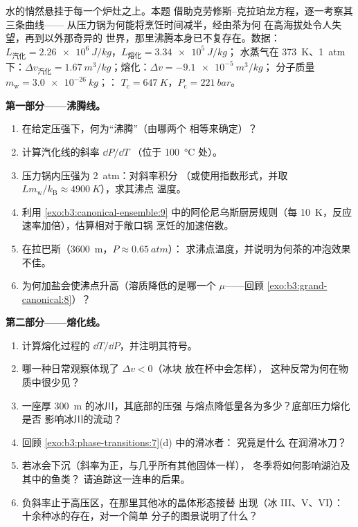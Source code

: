 \begin{problem}\label{pb:b3:phase-transitions:1}
水的悄然悬挂于每一个炉灶之上。本题
借助克劳修斯–克拉珀龙方程，逐一考察其三条曲线——
从压力锅为何能将烹饪时间减半，经由茶为何
在高海拔处令人失望，再到以外那奇异的
世界，那里沸腾本身已不复存在。数据：$L_{\text{汽化}}
= \qty{2.26e6}{J/kg}$，$L_{\text{熔化}} = \qty{3.34e5}{J/kg}$；
水蒸气在 \qty{373}{K}、\qty{1}{atm} 下：$\Delta v_{\text{汽化}}
= \qty{1.67}{m^3/kg}$；熔化：$\Delta v = \qty{-9.1e-5}{m^3/kg}$；
分子质量 $m_{\text{w}} = \qty{3.0e-26}{kg}$；：
$T_{\text{c}} = \qty{647}{K}$，$P_{\text{c}} = \qty{221}{bar}$。

\medskip\noindent\textbf{第一部分——沸腾线。}
\begin{enumerate}
  \item 在给定压强下，何为“沸腾”（由哪两个
        相等来确定）？
  \item 计算汽化线的斜率 $\dd P/\dd T$
        （位于 \qty{100}{\celsius} 处）。
  \item 压力锅内压强为 \qty{2}{atm}：对斜率积分
        （或使用指数形式，并取 $Lm_{\text{w}}/
        k_{\text{B}} \approx \qty{4900}{K}$），求其沸点
        温度。
  \item 利用
        \cref{exo:b3:canonical-ensemble:9} 中的阿伦尼乌斯厨房规则（每
        \qty{10}{K}，反应速率加倍），估算相对于敞口锅
        烹饪的加速倍数。
  \item 在拉巴斯（\qty{3600}{m}，$P \approx \qty{0.65}{atm}$）：
        求沸点温度，并说明为何茶的冲泡效果不佳。
  \item 为何加盐会使沸点升高（溶质降低的是哪一个
         $\mu$——回顾
        \cref{exo:b3:grand-canonical:8}）？
\end{enumerate}

\medskip\noindent\textbf{第二部分——熔化线。}
\begin{enumerate}[resume]
  \item 计算熔化过程的 $\dd T/\dd P$，并注明其符号。
  \item 哪一种日常观察体现了 $\Delta v < 0$（冰块
        放在杯中会怎样），
        这种反常为何在物质中很少见？
  \item 一座厚 \qty{300}{m} 的冰川，其底部的压强
        与熔点降低量各为多少？底部压力熔化是否
        影响冰川的流动？
  \item 回顾 \cref{exo:b3:phase-transitions:7}(d) 中的滑冰者：
        究竟是什么
        在润滑冰刀？
  \item 若冰会下沉（斜率为正，与几乎所有其他固体一样），
        冬季将如何影响湖泊及其中的鱼类？
        请追踪这一连串的后果。
  \item 负斜率止于高压区，在那里其他冰的晶体形态接替
        出现（冰 III、V、VI）：
        十余种冰的存在，对一个简单
        分子的图景说明了什么？
\end{enumerate}


\end{problem}
